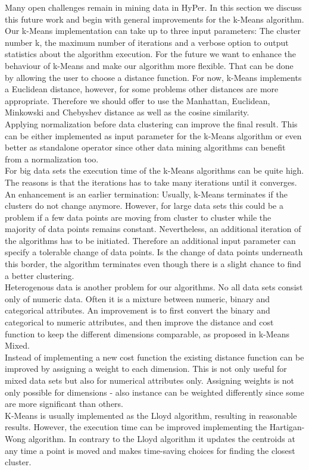 Many open challenges remain in mining data in HyPer. In this section we discuss this future work and begin with general improvements for the k-Means algorithm.
\\
Our k-Means implementation can take up to three input parameters: The cluster number k, the maximum number of iterations and a verbose option to output statistics about the algorithm execution. For the future we want to enhance the behaviour of k-Means and make our algorithm more flexible. That can be done by allowing the user to choose a distance function. For now, k-Means implements a Euclidean distance, however, for some problems other distances are more appropriate. Therefore we should offer to use the Manhattan, Euclidean, Minkowski and Chebyshev distance as well as the cosine similarity.
\\
Applying normalization before data clustering can improve the final result. This can be either implemented as input parameter for the k-Means algorithm or even better as standalone operator since other data mining algorithms can benefit from a normalization too.
\\
For big data sets the execution time of the k-Means algorithms can be quite high. The reasons is that the iterations has to take many iterations until it converges. An enhancement is an earlier termination: Usually, k-Means terminates if the clusters do not change anymore. However, for large data sets this could be a problem if a few data points are moving from cluster to cluster while the majority of data points remains constant. Nevertheless, an additional iteration of the algorithms has to be initiated. Therefore an additional input parameter can specify a tolerable change of data points. Is the change of data points underneath this border, the algorithm terminates even though there is a slight chance to find a better clustering.
\\
Heterogenous data is another problem for our algorithms. No all data sets consist only of numeric data. Often it is a mixture between numeric, binary and categorical attributes. An improvement is to first convert the binary and categorical to numeric attributes, and then improve the distance and cost function to keep the different dimensions comparable, as proposed in k-Means Mixed.
\\
Instead of implementing a new cost function the existing distance function can be improved by assigning a weight to each dimension. This is not only useful for mixed data sets but also for numerical attributes only. Assigning weights is not only possible for dimensions - also instance can be weighted differently since some are more significant than others.
\\
K-Means is usually implemented as the Lloyd algorithm, resulting in reasonable results. However, the execution time can be improved implementing the Hartigan-Wong algorithm. In contrary to the Lloyd algorithm it updates the centroids at any time a point is moved and makes time-saving choices for finding the closest cluster.
\\

